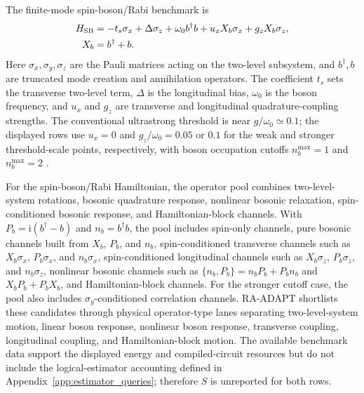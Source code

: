 \documentclass[
  reprint,
  amsmath,
  amssymb,
  aps,
  pra,
  nofootinbib,
  superscriptaddress,
  floatfix
]{revtex4-2}
\newcommand{\ii}{\mathrm{i}}
\begin{document}
The finite-mode spin-boson/Rabi benchmark is
\begin{equation*}
\begin{aligned}
H_{\rm SB}
&=-t_s\sigma_x+\Delta\sigma_z+\omega_0 b^\dagger b
+u_xX_b\sigma_x+g_zX_b\sigma_z,\\
X_b&=b^\dagger+b .
\end{aligned}
\end{equation*}
Here \(\sigma_x,\sigma_y,\sigma_z\) are the Pauli matrices acting on the
two-level subsystem, and \(b^\dagger,b\) are truncated mode creation and
annihilation operators. The coefficient \(t_s\) sets the transverse two-level
term, \(\Delta\) is the longitudinal bias, \(\omega_0\) is the boson frequency,
and \(u_x\) and \(g_z\) are transverse and longitudinal quadrature-coupling
strengths. The conventional ultrastrong threshold is near
\(g/\omega_0\simeq 0.1\); the displayed rows use \(u_x=0\) and
\(g_z/\omega_0=0.05\) or \(0.1\) for the weak and stronger threshold-scale
points, respectively, with boson occupation cutoffs \(n_b^{\max}=1\) and
\(n_b^{\max}=2\) \cite{Kockum2019Ultrastrong,FornDiaz2019Ultrastrong}.

For the spin-boson/Rabi Hamiltonian, the operator pool combines two-level-system
rotations, bosonic quadrature response, nonlinear bosonic relaxation,
spin-conditioned bosonic response, and Hamiltonian-block channels. With
\(P_b=\ii(b^\dagger-b)\) and \(n_b=b^\dagger b\), the pool includes spin-only
channels, pure bosonic channels built from \(X_b\), \(P_b\), and \(n_b\),
spin-conditioned transverse channels such as \(X_b\sigma_x\), \(P_b\sigma_x\),
and \(n_b\sigma_x\), spin-conditioned longitudinal channels such as
\(X_b\sigma_z\), \(P_b\sigma_z\), and \(n_b\sigma_z\), nonlinear bosonic
channels such as \(\{n_b,P_b\}=n_bP_b+P_bn_b\) and \(X_bP_b+P_bX_b\), and
Hamiltonian-block channels. For the stronger cutoff case, the pool also
includes \(\sigma_y\)-conditioned correlation channels. RA-ADAPT shortlists these
candidates through physical operator-type lanes separating two-level-system
motion, linear boson response, nonlinear boson response, transverse coupling,
longitudinal coupling, and Hamiltonian-block motion.
The available benchmark data support the displayed energy and compiled-circuit
resources but do not include the logical-estimator accounting defined in
Appendix~\ref{app:estimator_queries}; therefore \(S\) is
unreported for both rows.
\end{document}
